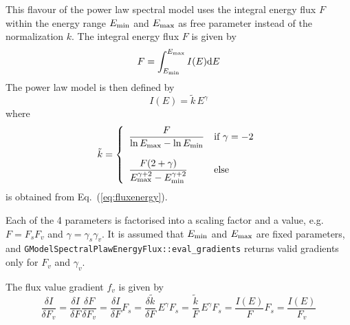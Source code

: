 \documentclass{article}[12pt,a4]
\begin{document}
This flavour of the power law spectral model uses the integral energy flux $F$ within the
energy range $E_{\rm min}$ and $E_{\rm max}$ as free parameter instead of
the normalization $k$.
The integral energy flux $F$ is given by
\begin{equation}
F = \int_{E_{\rm min}}^{E_{\rm max}} I(E) {\rm d}E
\label{eq:fluxint}
\end{equation}
The power law model is then defined by
\begin{equation}
I(E) = \tilde{k} \, E^{\gamma}
\end{equation}
where
\begin{equation}
   \tilde{k} = \left \{
   \begin{array}{l l}
      \displaystyle
      \frac{F}{\ln E_{\rm max} - \ln E_{\rm min}} 
        & \mbox{if $\gamma = -2$} \\
     \\
     \displaystyle
      \frac{F (2+\gamma)}{E_{\rm max}^{\gamma+2}-E_{\rm min}^{\gamma+2}} 
        & \mbox{else}
   \end{array}
   \right .
\end{equation}
is obtained from Eq.~(\ref{eq:fluxenergy}).

Each of the 4 parameters is factorised into a scaling factor and a value, e.g.
$F=F_s F_v$ and $\gamma=\gamma_s \gamma_v$.
It is assumed that $E_{\rm min}$ and $E_{\rm max}$ are fixed parameters,
and {\tt GModelSpectralPlawEnergyFlux::eval\_gradients} returns valid gradients only for 
$F_v$ and $\gamma_v$.

The flux value gradient $f_v$ is given by
\begin{equation}
\frac{\delta I}{\delta F_v} = 
  \frac{\delta I}{\delta F} \frac{\delta F}{\delta F_v} = 
  \frac{\delta I}{\delta F} F_s = 
  \frac{\delta \tilde{k}}{\delta F} \, E^{\gamma} F_s = 
  \frac{\tilde{k}}{F} \, E^{\gamma} F_s = 
  \frac{I(E)}{F} F_s =
  \frac{I(E)}{F_v}
\end{equation}
\end{document}
